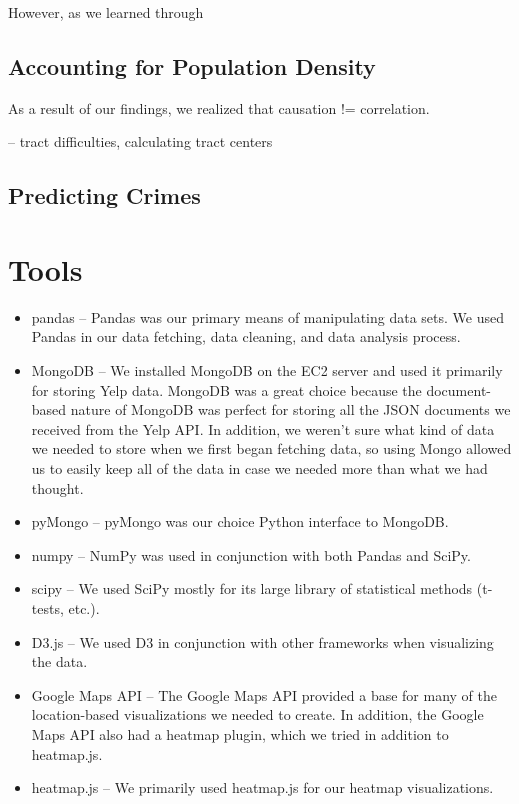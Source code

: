 \documentclass{article}
\begin{document}
However, as we learned through %

\subsection{Accounting for Population Density}

As a result of our findings, we realized that causation != correlation.

-- tract difficulties, calculating tract centers

\subsection{Predicting Crimes}


\section{Tools}

\begin{itemize}
\item pandas -- Pandas was our primary means of manipulating data sets. We
  used Pandas in our data fetching, data cleaning, and data analysis
  process.
\item MongoDB -- We installed MongoDB on the EC2 server and used it
  primarily for storing Yelp data. MongoDB was a great choice because the
  document-based nature of MongoDB was perfect for storing all the JSON
  documents we received from the Yelp API. In addition, we weren't sure
  what kind of data we needed to store when we first began fetching data,
  so using Mongo allowed us to easily keep all of the data in case we
  needed more than what we had thought.
\item pyMongo -- pyMongo was our choice Python interface to MongoDB.
\item numpy -- NumPy was used in conjunction with both Pandas and SciPy.
\item scipy -- We used SciPy mostly for its large library of statistical
  methods (t-tests, etc.).
\item D3.js -- We used D3 in conjunction with other frameworks when
  visualizing the data.
\item Google Maps API -- The Google Maps API provided a base for many of
  the location-based visualizations we needed to create. In addition, the
  Google Maps API also had a heatmap plugin, which we tried in addition to
  heatmap.js.
\item heatmap.js -- We primarily used heatmap.js for our heatmap
  visualizations.
\end{itemize}
\end{document}
